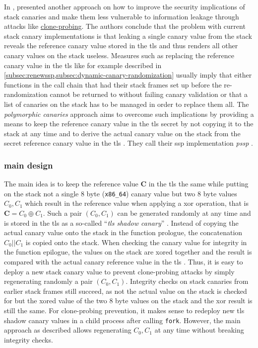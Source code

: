 In \citeyear{Wang2018}, \citeauthor{Wang2018} presented another approach on how to improve the security implications of stack canaries and make them less vulnerable to information leakage through attacks like \hyperref[subsec:bf-information-leaking]{clone-probing}.
The authors conclude that the problem with current stack canary implementations is that leaking a single canary value from the stack reveals the reference canary value stored in the \gls{tls} and thus renders all other canary values on the stack useless.
Measures such as replacing the reference canary value in the \gls{tls} like for example described in \cref{subsec:renewssp,subsec:dynamic-canary-randomization} usually imply that either functions in the call chain that had their stack frames set up before the re-randomization cannot be returned to without failing canary validation or that a list of canaries on the stack has to be managed in order to replace them all.
The \emph{polymorphic canaries} approach aims to overcome such implications by providing a means to keep the reference canary value in the \gls{tls} secret by not copying it to the stack at any time and to derive the actual canary value on the stack from the secret reference canary value in the \gls{tls} \cite[244\psq]{Wang2018}.
They call their \gls{ssp} implementation \emph{\gls{pssp}} \cite[243]{Wang2018}.

\subsubsection{ main design}
\label{subsubsec:p-ssp-main-design}

The main idea is to keep the reference value \textbf{C} in the \gls{tls} the same while putting on the stack not a single 8 byte (\texttt{x86\_64}) canary value but two 8 byte values $ C_0,C_1 $ which result in the reference value when applying a \acs{xor} operation, that is $ \textbf{C} = C_0 \oplus C_1 $.
Such a pair $ (C_0, C_1) $ can be generated randomly at any time and is stored in the \gls{tls} as a so-called ``\emph{\acs{tls} shadow canary}'' \cite[246]{Wang2018}.
Instead of copying the actual canary value onto the stack in the function prologue, the concatenation $ C_0 || C_1 $ is copied onto the stack.
When checking the canary value for integrity in the function epilogue, the values on the stack are \acs{xor}ed together and the result is compared with the actual canary reference value in the \gls{tls} \cite[245\psq]{Wang2018}.
Thus, it is easy to deploy a new stack canary value to prevent clone-probing attacks by simply regenerating randomly a pair $ (C_0, C_1) $.
Integrity checks on stack canaries from earlier stack frames still succeed, as not the actual value on the stack is checked for but the \acs{xor}ed value of the two 8 byte values on the stack and the \acs{xor} result is still the same.
For clone-probing prevention, it makes sense to redeploy new \acs{tls} shadow canary values in a child process after calling \texttt{fork}.
However, the main approach as described allows regenerating $ C_0, C_1 $ at any time without breaking integrity checks.

